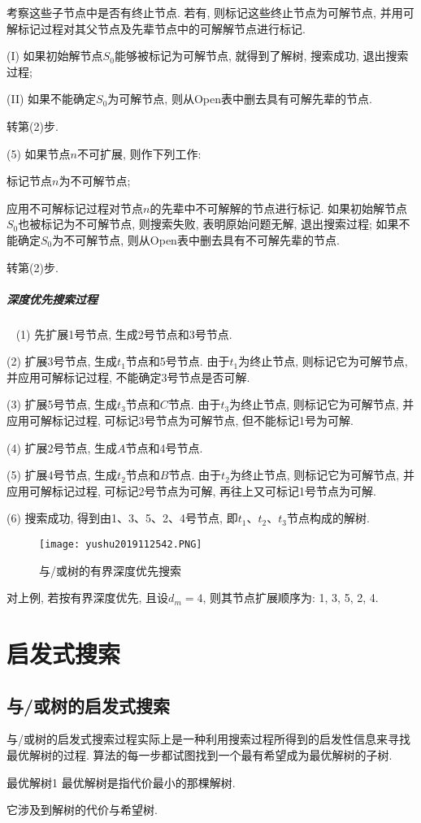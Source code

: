     \quad{} 考察这些子节点中是否有终止节点. 若有, 则标记这些终止节点为可解节点, 并用可解标记过程对其父节点及先辈节点中的可解解节点进行标记.

    \quad\quad (I) 如果初始解节点$S_0$能够被标记为可解节点, 就得到了解树, 搜索成功, 退出搜索过程;

    \quad\quad (II) 如果不能确定$S_0$为可解节点, 则从Open表中删去具有可解先辈的节点.

   \quad{} 转第(2)步.

(5) 如果节点$n$不可扩展, 则作下列工作:

   \quad{} 标记节点$n$为不可解节点;

   \quad{} 应用不可解标记过程对节点$n$的先辈中不可解解的节点进行标记. 如果初始解节点$S_0$也被标记为不可解节点, 则搜索失败, 表明原始问题无解, 退出搜索过程;
   如果不能确定$S_0$为不可解节点, 则从Open表中删去具有不可解先辈的节点.

   \quad{} 转第(2)步.
\subparagraph{深度优先搜索过程}~{}
(1) 先扩展1号节点, 生成2号节点和3号节点.

(2) 扩展3号节点, 生成$t_1$节点和5号节点. 由于$t_1$为终止节点, 则标记它为可解节点, 并应用可解标记过程, 不能确定3号节点是否可解.

(3) 扩展5号节点, 生成$t_3$节点和$C$节点. 由于$t_3$为终止节点, 则标记它为可解节点, 并应用可解标记过程, 可标记3号节点为可解节点, 但不能标记1号为可解.

(4) 扩展2号节点, 生成$A$节点和4号节点.

(5) 扩展4号节点, 生成$t_2$节点和$B$节点. 由于$t_2$为终止节点, 则标记它为可解节点, 并应用可解标记过程, 可标记2号节点为可解, 再往上又可标记1号节点为可解.

(6) 搜索成功, 得到由1、3、5、2、4号节点, 即$t_1$、$t_2$、$t_3$节点构成的解树.
\begin{figure}[H]
    \centering
    \texttt{[image: yushu2019112542.PNG]}
    \caption{与/或树的有界深度优先搜索}
    \label{AI32fig42}
\end{figure}
对上例, 若按有界深度优先, 且设$d_m=4$, 则其节点扩展顺序为: 1, 3, 5, 2, 4.
\section{启发式搜索}
\subsection{与/或树的启发式搜索}
    与/或树的启发式搜索过程实际上是一种利用搜索过程所得到的启发性信息来寻找最优解树的过程. 算法的每一步都试图找到一个最有希望成为最优解树的子树.
\begin{mydef}{最优解树}{1}
    最优解树是指代价最小的那棵解树. 
\end{mydef}
它涉及到解树的代价与希望树.
